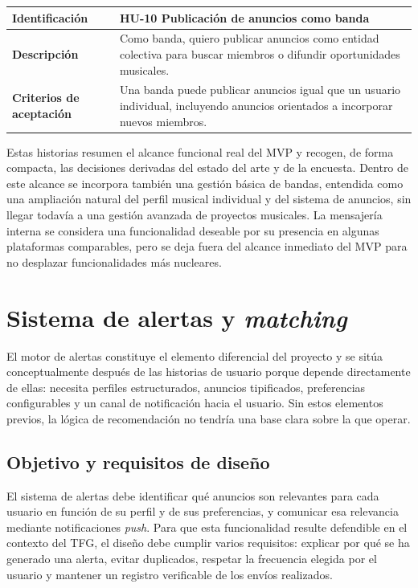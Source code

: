 \documentclass[12pt,a4paper]{report}
\begin{document}
\begin{center}
\begin{tabular}{|L{2.9cm}|L{10cm}|}
\hline
\textbf{Identificación} & HU-10 Publicación de anuncios como banda \\
\hline
\textbf{Descripción} & Como banda, quiero publicar anuncios como entidad colectiva para buscar miembros o difundir oportunidades musicales. \\
\hline
\textbf{Criterios de aceptación} & Una banda puede publicar anuncios igual que un usuario individual, incluyendo anuncios orientados a incorporar nuevos miembros. \\
\hline
\end{tabular}
\end{center}

Estas historias resumen el alcance funcional real del MVP y recogen, de forma compacta, las decisiones derivadas del estado del arte y de la encuesta. Dentro de este alcance se incorpora también una gestión básica de bandas, entendida como una ampliación natural del perfil musical individual y del sistema de anuncios, sin llegar todavía a una gestión avanzada de proyectos musicales. La mensajería interna se considera una funcionalidad deseable por su presencia en algunas plataformas comparables, pero se deja fuera del alcance inmediato del MVP para no desplazar funcionalidades más nucleares.

\section{Sistema de alertas y \textit{matching}}
El motor de alertas constituye el elemento diferencial del proyecto y se sitúa conceptualmente después de las historias de usuario porque depende directamente de ellas: necesita perfiles estructurados, anuncios tipificados, preferencias configurables y un canal de notificación hacia el usuario. Sin estos elementos previos, la lógica de recomendación no tendría una base clara sobre la que operar.

\subsection{Objetivo y requisitos de diseño}
El sistema de alertas debe identificar qué anuncios son relevantes para cada usuario en función de su perfil y de sus preferencias, y comunicar esa relevancia mediante notificaciones \textit{push}. Para que esta funcionalidad resulte defendible en el contexto del TFG, el diseño debe cumplir varios requisitos: explicar por qué se ha generado una alerta, evitar duplicados, respetar la frecuencia elegida por el usuario y mantener un registro verificable de los envíos realizados.
\end{document}
